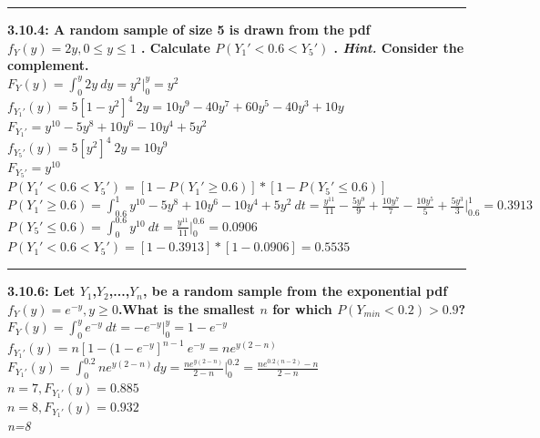 \documentclass[11pt]{article}
\newcommand\question[2]{\vspace{.25in}\hrule\textbf{#1: #2}\vspace{.5em}\vspace{.10in}}
\begin{document}
\raggedright
\newcommand\NAME{Jonathan Lopez}  %
\newcommand\HWNUM{4}              %



\question{3.10.4}
{A random sample of size 5 is drawn from the pdf
    $f_{Y}(y)=2y, 0 \leq y \leq 1$
. Calculate
$P(Y_{1}' < 0.6 < Y_{5}')$
. \emph{Hint.} Consider the complement.}
\\
$
F_{Y}(y) 
=
\int_{0}^{y} 2y\ dy
=
y^{2} \big |_{0}^{y}
=
y^{2}
$
\\
$
f_{Y_{1}'}(y)
=
5[1-y^{2}]^{4} \ 2y
=
10y^{9} - 40y^{7} + 60y^{5} - 40y^{3} + 10y
$
\\
$
F_{Y_{1}'}
=
y^{10} - 5y^{8} + 10y^{6} - 10y^{4} + 5y^{2}
$
\\
$
f_{Y_{5}'}(y)
=
5[y^{2}]^{4} \ 2y
=
10y^9
$
\\
$
F_{Y_{5}'}
=
y^{10}
$
\\
$
P(Y_{1}' < 0.6 < Y_{5}')
=
[1-P(Y_{1}' \geq 0.6)] * [1-P(Y_{5}' \leq 0.6)]
$
\\
$
P(Y_{1}' \geq 0.6) 
=
\int_{0.6}^{1} y^{10} - 5y^{8} + 10y^{6} - 10y^{4} + 5y^{2} \ dt
=
\frac{y^{11}}{11} - 
\frac{5y^{9}}{9} + 
\frac{10y^{7}}{7} - 
\frac{10y^{5}}{5} + 
\frac{5y^{3}}{3}
\big |_{0.6}^{1}
=
0.3913
$
\\
$
P(Y_{5}' \leq 0.6)
=
\int_{0}^{0.6} y^{10} \ dt
=
\frac{y^{11}}{11} \big |_{0}^{0.6}
=
0.0906
$
\\
$
P(Y_{1}' < 0.6 < Y_{5}')
=
[1- 0.3913] * [1-0.0906]
=
0.5535
$


\question{3.10.6}
{Let $Y_{1}$,$Y_{2}$,...,$Y_{n}$, be a random sample from the exponential pdf
$f_{Y}(y) = e^{-y},y \geq 0$.What is the smallest $n$ for which
$P(Y_{min} < 0.2) > 0.9$?
}
\\
$
F_{Y}(y) 
=
\int_{0}^{y} e^{-y} \ dt
=
-e^{-y} \big |_{0}^{y}
=
1 -e^{-y}
$
\\
$
f_{Y_{1}'}(y)
=
n[1-(1-e^{-y}]^{n-1} \ e^{-y}
=
ne^{y(2-n)}
$
\\
$
F_{Y_{1}'}(y)
=
\int_{0}^{0.2} ne^{y(2-n)} dy
=
\frac{ne^{y(2-n)}}{2-n} \big |_{0}^{0.2}
=
\frac{ne^{0.2(n-2)} - n}{2-n} 
$
\\
$
n=7,
F_{Y_{1}'}(y)
=
0.885
$
\\
$
n=8,
F_{Y_{1}'}(y)
=
0.932
$
\\
\emph{n=8}
\end{document}
